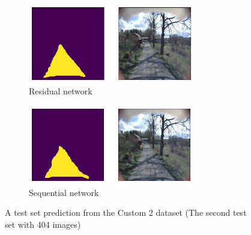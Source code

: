\documentclass[USenglish]{ifimaster}  %
\begin{document}
\begin{figure}[ht]
\centering
\begin{subfigure}[b]{\textwidth}
\centering
\includegraphics[width=0.8\textwidth]{bilder/custom_2_exclusive/1938_res.png}
\caption{Residual network}
\label{fig:custom_2_2_res}
\end{subfigure}
\hfill
\begin{subfigure}[b]{\textwidth}
\centering
\includegraphics[width=0.8\textwidth]{bilder/custom_2_exclusive/1938_seq.png}
\caption{Sequential network}
\label{fig:custom_2_2_seq}
\end{subfigure}
\caption{A test set prediction from the Custom 2 dataset (The second test set with 404 images)}
\end{figure}
\end{document}
